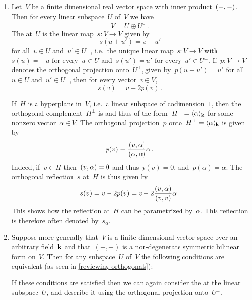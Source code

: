 \begin{recall}
  \label{recalling reflections}
  \leavevmode
  \begin{enumerate}
    \item
      Let~$V$ be a finite dimensional real vector space with inner product~$(-,-)$.
      Then for every linear subspace~$U$ of~$V$ we have
      \[
        V
        =
        U \oplus U^\perp \,.
      \]
      The  at~$U$ is the linear map~$s \colon V \to V$ given by
      \[
        s(u + u') = u - u'
      \]
      for all~$u \in U$ and~$u' \in U^\perp$, i.e.\ the unique linear map~$s \colon V \to V$ with~$s(u) = -u$ for every~$u \in U$ and~$s(u') = u'$ for every~$u' \in U^\perp$.
      If~$p \colon V \to V$ denotes the orthogonal projection onto~$U^\perp$, given by~$p(u + u') = u'$ for all~$u \in U$ and~$u' \in U^\perp$, then for every vector~$v \in V$,
      \[
        s(v)
        =
        v - 2 p(v) \,.
      \]
      
      If~$H$ is a hyperplane in~$V$, i.e.\ a linear subspace of codimension~$1$, then the orthogonal complement~$H^\perp$ is {\onedimensional} and thus of the form~$H^\perp = \langle\alpha\rangle_{\mathbf{k}}$ for some nonzero vector~$\alpha \in V$.
      The orthogonal projection~$p$ onto~$H^\perp = \langle\alpha\rangle_{\mathbf{k}}$ is given by
      \[
        p(v)
        =
        \frac{(v,\alpha)}{(\alpha,\alpha)} \alpha \,.
      \]
      Indeed, if~$v \in H$ then~$(v,\alpha) = 0$ and thus~$p(v) = 0$, and~$p(\alpha) = \alpha$.
      The orthogonal reflection~$s$ at~$H$ is thus given by
      \[
        s(v)
        =
        v - 2 p(v)
        =
        v - 2 \frac{(v,\alpha)}{(v,v)} \alpha \,.
      \]
      This shows how the reflection at~$H$ can be parametrized by~$\alpha$.
      This reflection is therefore often denoted by~$s_\alpha$.
    \item
      Suppose more generally that~$V$ is a finite dimensional vector space over an arbitrary field~$\mathbf{k}$ and that~$(-,-)$ is a non-degenerate symmetric bilinear form on~$V$.
      Then for any subspace~$U$ of~$V$ the following conditions are equivalent (as seen in \cref{reviewing orthogonals}):
      If these conditions are satisfied then we can again consider the  at the linear subspace~$U$, and describe it using the orthogonal projection onto~$U^\perp$.
      

\end{enumerate}
\end{recall}
